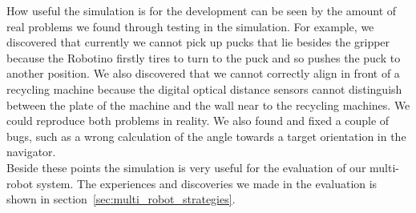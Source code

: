 How useful the simulation is for the development can be seen by the amount of real problems we found through testing in the simulation. For example, we discovered that currently we cannot pick up pucks that lie besides the gripper because the Robotino firstly tires to turn to the puck and so pushes the puck to another position. We also discovered that we cannot correctly align in front of a recycling machine because the digital optical distance sensors cannot distinguish between the plate of the machine and the wall near to the recycling machines. We could reproduce both problems in reality. We also found and fixed a couple of bugs, such as a wrong calculation of the angle towards a target orientation in the navigator.\\
Beside these points the simulation is very useful for the evaluation of our multi-robot system. The experiences and discoveries we made in the evaluation is shown in section~\ref{sec:multi_robot_strategies}.\\

